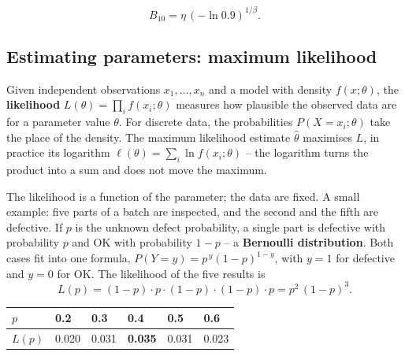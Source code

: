\documentclass[
  letterpaper,
  DIV=11,
  numbers=noendperiod]{scrreprt}
\begin{document}
\[B_{10} = \eta\,\left(-\ln 0.9\right)^{1/\beta}.\]

\subsection{Estimating parameters: maximum
likelihood}\label{estimating-parameters-maximum-likelihood}

\begin{tcolorbox}[enhanced jigsaw, left=2mm, title=\textcolor{quarto-callout-note-color}{\faInfo}\hspace{0.5em}{Definition: Maximum likelihood estimation (MLE)}, opacityback=0, breakable, rightrule=.15mm, arc=.35mm, toptitle=1mm, colbacktitle=quarto-callout-note-color!10!white, opacitybacktitle=0.6, coltitle=black, colframe=quarto-callout-note-color-frame, bottomrule=.15mm, leftrule=.75mm, bottomtitle=1mm, titlerule=0mm, toprule=.15mm, colback=white]

Given independent observations \(x_1, \dots, x_n\) and a model with
density \(f(x;\theta)\), the \textbf{likelihood}
\(L(\theta) = \prod_i f(x_i;\theta)\) measures how plausible the
observed data are for a parameter value \(\theta\). For discrete data,
the probabilities \(P(X = x_i;\theta)\) take the place of the density.
The maximum likelihood estimate \(\hat\theta\) maximises \(L\), in
practice its logarithm \(\ell(\theta) = \sum_i \ln f(x_i;\theta)\) --
the logarithm turns the product into a sum and does not move the
maximum.

\end{tcolorbox}

The likelihood is a function of the parameter; the data are fixed. A
small example: five parts of a batch are inspected, and the second and
the fifth are defective. If \(p\) is the unknown defect probability, a
single part is defective with probability \(p\) and OK with probability
\(1 - p\) -- a \textbf{Bernoulli distribution}. Both cases fit into one
formula, \(P(Y = y) = p^{\,y}(1-p)^{1-y}\), with \(y = 1\) for defective
and \(y = 0\) for OK. The likelihood of the five results is
\[L(p) = (1-p) \cdot p \cdot (1-p) \cdot (1-p) \cdot p = p^2\,(1-p)^3.\]

\begin{longtable}[]{@{}llllll@{}}
\toprule\noalign{}
\(p\) & 0.2 & 0.3 & 0.4 & 0.5 & 0.6 \\
\midrule\noalign{}
\endhead
\bottomrule\noalign{}
\endlastfoot
\(L(p)\) & 0.020 & 0.031 & \textbf{0.035} & 0.031 & 0.023 \\
\end{longtable}
\end{document}
